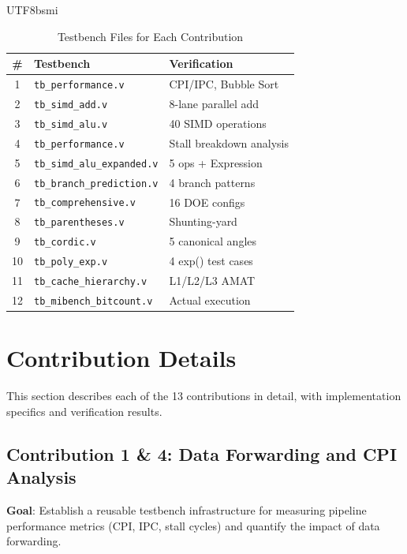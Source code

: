 \documentclass[journal,twoside]{IEEEtran}
\begin{document}
\begin{CJK}{UTF8}{bsmi}
\begin{table}[!t]
\centering
\caption{Testbench Files for Each Contribution}
\label{tab:testbenches}
\footnotesize
\begin{tabular}{@{}clp{3.5cm}@{}}
\toprule
\textbf{\#} & \textbf{Testbench} & \textbf{Verification} \\
\midrule
1 & \texttt{tb\_performance.v} & CPI/IPC, Bubble Sort \\
2 & \texttt{tb\_simd\_add.v} & 8-lane parallel add \\
3 & \texttt{tb\_simd\_alu.v} & 40 SIMD operations \\
4 & \texttt{tb\_performance.v} & Stall breakdown analysis \\
5 & \texttt{tb\_simd\_alu\_expanded.v} & 5 ops + Expression \\
6 & \texttt{tb\_branch\_prediction.v} & 4 branch patterns \\
7 & \texttt{tb\_comprehensive.v} & 16 DOE configs \\
8 & \texttt{tb\_parentheses.v} & Shunting-yard \\
9 & \texttt{tb\_cordic.v} & 5 canonical angles \\
10 & \texttt{tb\_poly\_exp.v} & 4 exp() test cases \\
11 & \texttt{tb\_cache\_hierarchy.v} & L1/L2/L3 AMAT \\
12 & \texttt{tb\_mibench\_bitcount.v} & Actual execution \\
\bottomrule
\end{tabular}
\end{table}

\section{Contribution Details}

This section describes each of the 13 contributions in detail, with implementation specifics and verification results.

\subsection{Contribution 1 \& 4: Data Forwarding and CPI Analysis}
\textbf{Goal}: Establish a reusable testbench infrastructure for measuring pipeline performance metrics (CPI, IPC, stall cycles) and quantify the impact of data forwarding.


\end{CJK}
\end{document}

